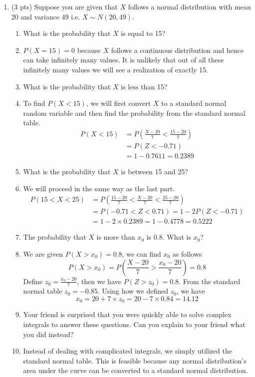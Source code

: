 \documentclass{./../../Latex/handout}
\begin{document}
\thispagestyle{plain}

\begin{enumerate}

\item (3 pts) Suppose you are given that $X$ follows a normal distribution with mean 20 and variance 49 i.e. $X \sim N(20,49)$.
 \begin{enumerate}
 \item What is the probability that $X$ is equal to 15?
 \item [] $P(X=15) = 0$ because $X$ follows a continuous distribution and hence can take infinitely many values. It is unlikely that out of all these infinitely many values we will see a realization of exactly 15. 
\item What is the probability that $X$ is less than 15? 
\item [] To find $P(X < 15)$, we will first convert $X$ to a standard normal random variable and then find the probability from the standard normal table. 
\begin{align*}
 P(X < 15) &= P \left(\frac{X-20}{7} < \frac{15-20}{7}\right) \\ & = P(Z < -0.71)\\ &= 1-0.7611 = 0.2389  
 \end{align*}
\item What is the probability that $X$ is between 15 and 25?
\item [] We will proceed in the same way as the last part. 
\begin{align*}
 P(15 < X < 25) &= P \left(\frac{15-20}{7} < \frac{X-20}{7} < \frac{25-20}{7} \right) \\
&= P(-0.71< Z < 0.71) = 1-2P(Z< -0.71) \\ 
&= 1-2 \times 0.2389  = 1-0.4778 = 0.5222
\end{align*}
\item The probability that $X$ is more than $x_0$ is 0.8. What is $x_0$?
\item[] We are given $P(X >x_0) = 0.8 $, we can find $x_0$ as follows
$$P(X >x_0) =  P \left(\frac{X-20}{7} > \frac{x_0-20}{7}\right) = 0.8 $$
Define $z_0 = \frac{x_0-20}{7}$, then we have $P(Z>z_0) = 0.8$. From the standard normal table $z_0 = -0.85$. Using how we defined $z_0$, we have 
$$ x_0 = 20 + 7 \times z_0 = 20 - 7 \times 0.84 = 14.12 $$ 
\item Your friend is surprised that you were quickly able to solve complex integrals to answer these questions. Can you explain to your friend what you did instead?
\item [] Instead of dealing with complicated integrals, we simply utilized the standard normal table. This is feasible because any normal distribution's area under the curve can be converted to a standard normal distribution. 


\end{enumerate}
\end{enumerate}
\end{document}
